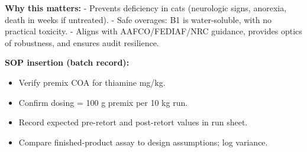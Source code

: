 \textbf{Why this matters:}  
- Prevents deficiency in cats (neurologic signs, anorexia, death in weeks if untreated).  
- Safe overages: B1 is water-soluble, with no practical toxicity.  
- Aligns with AAFCO/FEDIAF/NRC guidance, provides optics of robustness, and ensures audit resilience.

\textbf{SOP insertion (batch record):}
\begin{itemize}[leftmargin=1.2em]
  \item Verify premix COA for thiamine mg/kg.  
  \item Confirm dosing = 100 g premix per 10 kg run.  
  \item Record expected pre-retort and post-retort values in run sheet.  
  \item Compare finished-product assay to design assumptions; log variance.  
\end{itemize}

